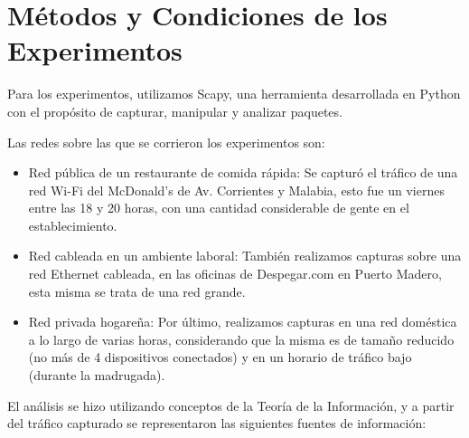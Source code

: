 \section{Métodos y Condiciones de los Experimentos}

Para los experimentos, utilizamos Scapy, una herramienta desarrollada en Python con el propósito de capturar, manipular y analizar paquetes.

Las redes sobre las que se corrieron los experimentos son:

\begin{itemize}

  \item Red pública de un restaurante de comida rápida: Se capturó el tráfico de una red Wi-Fi del McDonald's de Av. Corrientes y Malabia, esto fue un viernes entre las 18 y 20 horas, con una cantidad considerable de gente en el establecimiento.
  
  \item Red cableada en un ambiente laboral: También realizamos capturas sobre una red Ethernet cableada, en las oficinas de Despegar.com en Puerto Madero, esta misma se trata de una red grande.
  
  \item Red privada hogareña: Por último, realizamos capturas en una red doméstica a lo largo de varias horas, considerando que la misma es de tamaño reducido (no más de 4 dispositivos conectados) y en un horario de tráfico bajo (durante la madrugada).

\end{itemize}

El análisis se hizo utilizando conceptos de la Teoría de la Información, y a partir del tráfico capturado se representaron las siguientes fuentes de información:

